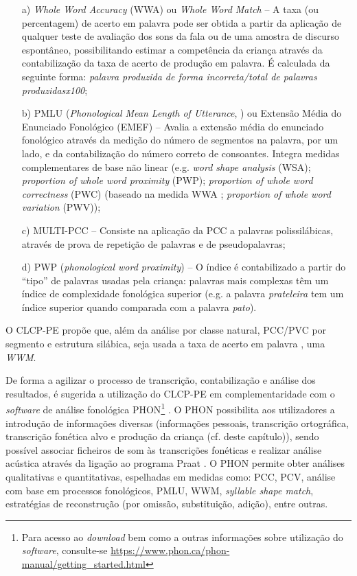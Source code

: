 \documentclass[output=paper,colorlinks,citecolor=brown,booklanguage=portuguese]{langscibook}
\begin{document}
\begin{enumerate}
    \item [a)] \emph{Whole Word Accuracy} (WWA) \citep{Schmitt1983} ou \emph{Whole Word Match} \citep{Bernhardt2000, Ramalho2017} -- A taxa (ou percentagem) de acerto em palavra pode ser obtida a partir da aplicação de qualquer teste de avaliação dos sons da fala ou de uma amostra de discurso espontâneo, possibilitando estimar a competência da criança através da contabilização da taxa de acerto de produção em palavra. É calculada da seguinte forma: \emph{palavra produzida de forma incorreta/total de palavras produzidasx100};
    \item[b)] PMLU (\emph{Phonological Mean Length of Utterance}, \citealp{Ingram2002}) ou Extensão Média do Enunciado Fonológico (EMEF) -- Avalia a extensão média do enunciado fonológico através da medição do número de segmentos na palavra, por um lado, e da contabilização do número correto de consoantes. Integra medidas complementares de base não linear (e.g. \emph{word shape analysis} (WSA); \emph{proportion of whole word proximity} (PWP); \emph{proportion of whole word correctness} (PWC) (baseado na medida WWA \citep{Schmitt1983}; \emph{proportion of whole word variation} (PWV));
    \item[c)] MULTI-PCC \citep{Larrivee1999} -- Consiste na aplicação da PCC a palavras polissilábicas, através de prova de repetição de palavras e de pseudopalavras;
    \item[d)] PWP (\emph{phonological word proximity}) \citep{StoelGammon2010} -- O índice é contabilizado a partir do “tipo” de palavras usadas pela criança: palavras mais complexas têm um índice de complexidade fonológica superior (e.g. a palavra \emph{prateleira} tem um índice superior quando comparada com a palavra \emph{pato}). 
\end{enumerate}

O CLCP-PE propõe que, além da análise por classe natural, PCC/PVC por segmento e estrutura silábica, seja usada a taxa de acerto em palavra \citep{Bernhardt2000, Ramalho2017}, uma \emph{WWM}.

De forma a agilizar o processo de transcrição, contabilização e análise dos resultados, é sugerida a utilização do CLCP-PE em complementaridade com o \emph{software} de análise fonológica PHON\footnote{Para acesso ao \emph{download} bem como a outras informações sobre utilização do \emph{software}, consulte-se \url{https://www.phon.ca/phon-manual/getting_started.html}}  \citep{Hedlund2019}. O PHON possibilita aos utilizadores a introdução de informações diversas (informações pessoais, transcrição ortográfica, transcrição fonética alvo e produção da criança (cf.  deste capítulo)), sendo possível associar ficheiros de som às transcrições fonéticas e realizar análise acústica através da ligação ao programa Praat \citep{Boersma2020}. O PHON permite obter análises qualitativas e quantitativas, espelhadas em medidas como: PCC, PCV, análise com base em processos fonológicos, PMLU, WWM, \emph{syllable shape match}, estratégias de reconstrução (por omissão, substituição, adição), entre outras.
\end{document}
